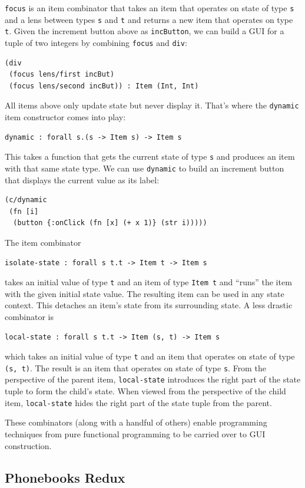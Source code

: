 \documentclass[sigplan,screen]{acmart}
\begin{document}
\texttt{focus} is an item combinator that takes an
item that operates on state of type \texttt{s} and a lens between
types \texttt{s} and \texttt{t} and returns a new item that operates
on type \texttt{t}.  Given the increment button above as
\texttt{incButton}, we can build a GUI for a tuple of two integers by
combining \texttt{focus} and \texttt{div}:
%
\begin{verbatim}
(div
 (focus lens/first incBut)
 (focus lens/second incBut)) : Item (Int, Int)
\end{verbatim}
%
All items above only update
state but never display it. That's where the \texttt{dynamic} item
constructor comes into play:
%
\begin{verbatim}
dynamic : forall s.(s -> Item s) -> Item s
\end{verbatim}
%
This takes a
function that gets the current state of type \texttt{s} 
and produces an item with that same state type. We can use
\texttt{dynamic} to build an increment button that displays the
current value as its label:
%
\begin{verbatim}
(c/dynamic
 (fn [i]
  (button {:onClick (fn [x] (+ x 1)} (str i)))))
\end{verbatim}
%
The item combinator
%
\begin{verbatim}
isolate-state : forall s t.t -> Item t -> Item s
\end{verbatim}
%
takes an initial value of type \texttt{t} and an item of
type \texttt{Item t} and ``runs'' the item with the given initial
state value. The resulting item can be used in any state context. This
detaches an item's state from its surrounding
state.
A less drastic combinator is
%
\begin{verbatim}
local-state : forall s t.t -> Item (s, t) -> Item s
\end{verbatim}
%
which takes an initial value of type \texttt{t} and an item that
operates on state of type \texttt{(s, t)}. The result is an item that
operates on state of type \texttt{s}. From the perspective
of the parent item, \texttt{local-state} introduces the right part of
the state tuple to form the child's state. When viewed from the
perspective of the child item, \texttt{local-state} hides the right
part of the state tuple from the parent.

These combinators (along with a handful of others) enable programming
techniques from pure functional programming to be carried over to GUI
construction.

\subsection{Phonebooks Redux}
\end{document}
